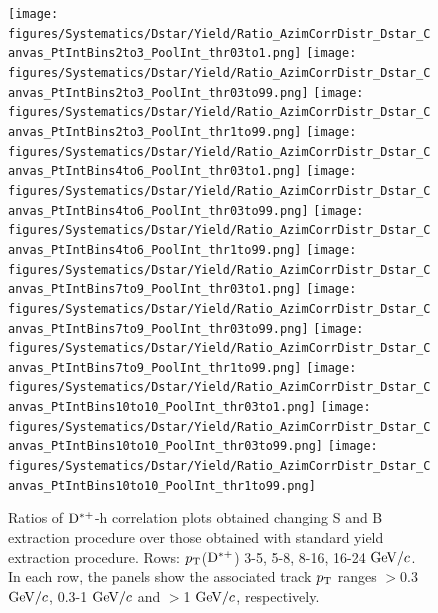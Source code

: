 \begin{figure}
\centering
{\texttt{[image: figures/Systematics/Dstar/Yield/Ratio\_AzimCorrDistr\_Dstar\_Canvas\_PtIntBins2to3\_PoolInt\_thr03to1.png]}}
{\texttt{[image: figures/Systematics/Dstar/Yield/Ratio\_AzimCorrDistr\_Dstar\_Canvas\_PtIntBins2to3\_PoolInt\_thr03to99.png]}}
{\texttt{[image: figures/Systematics/Dstar/Yield/Ratio\_AzimCorrDistr\_Dstar\_Canvas\_PtIntBins2to3\_PoolInt\_thr1to99.png]}}
{\texttt{[image: figures/Systematics/Dstar/Yield/Ratio\_AzimCorrDistr\_Dstar\_Canvas\_PtIntBins4to6\_PoolInt\_thr03to1.png]}}
{\texttt{[image: figures/Systematics/Dstar/Yield/Ratio\_AzimCorrDistr\_Dstar\_Canvas\_PtIntBins4to6\_PoolInt\_thr03to99.png]}}
{\texttt{[image: figures/Systematics/Dstar/Yield/Ratio\_AzimCorrDistr\_Dstar\_Canvas\_PtIntBins4to6\_PoolInt\_thr1to99.png]}}
{\texttt{[image: figures/Systematics/Dstar/Yield/Ratio\_AzimCorrDistr\_Dstar\_Canvas\_PtIntBins7to9\_PoolInt\_thr03to1.png]}}
{\texttt{[image: figures/Systematics/Dstar/Yield/Ratio\_AzimCorrDistr\_Dstar\_Canvas\_PtIntBins7to9\_PoolInt\_thr03to99.png]}}
{\texttt{[image: figures/Systematics/Dstar/Yield/Ratio\_AzimCorrDistr\_Dstar\_Canvas\_PtIntBins7to9\_PoolInt\_thr1to99.png]}}
{\texttt{[image: figures/Systematics/Dstar/Yield/Ratio\_AzimCorrDistr\_Dstar\_Canvas\_PtIntBins10to10\_PoolInt\_thr03to1.png]}}
{\texttt{[image: figures/Systematics/Dstar/Yield/Ratio\_AzimCorrDistr\_Dstar\_Canvas\_PtIntBins10to10\_PoolInt\_thr03to99.png]}}
{\texttt{[image: figures/Systematics/Dstar/Yield/Ratio\_AzimCorrDistr\_Dstar\_Canvas\_PtIntBins10to10\_PoolInt\_thr1to99.png]}}
\caption{Ratios of ${\rm D^{*+}}$-h correlation plots obtained changing S and B extraction procedure over those obtained with standard yield extraction procedure. Rows: $p_{\rm T}$(${\rm D^{*+}}$) 3-5, 5-8, 8-16, 16-24 $\mathrm{GeV}/c$. In each row, the panels show the associated track $p_{\rm T}$ ranges $>$0.3 $\mathrm{GeV}/c$, 0.3-1 $\mathrm{GeV}/c$ and $>$1 $\mathrm{GeV}/c$, respectively.}
\label{fig:Syst_DstarYield}
\end{figure}

